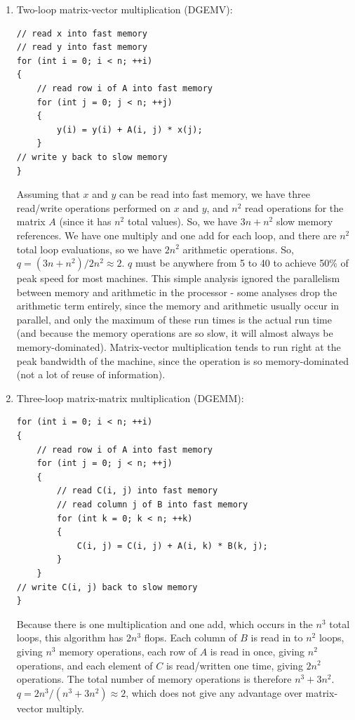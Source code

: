 \documentclass[10pt]{article}
\begin{document}
\begin{flushleft}
\begin{enumerate}
\item Two-loop matrix-vector multiplication (DGEMV):

\begin{lstlisting}[basicstyle=\ttfamily\small]
// read x into fast memory
// read y into fast memory
for (int i = 0; i < n; ++i)
{
	// read row i of A into fast memory
	for (int j = 0; j < n; ++j)
	{
		y(i) = y(i) + A(i, j) * x(j);
	}
// write y back to slow memory
}
\end{lstlisting}

Assuming that \(x\) and \(y\) can be read into fast memory, we have three read/write operations performed on \(x\) and \(y\), and \(n^2\) read operations for the matrix \(A\) (since it has \(n^2\) total values). So, we have \(3n+n^2\) slow memory references. We have one multiply and one add for each loop, and there are \(n^2\) total loop evaluations, so we have \(2n^2\) arithmetic operations. So, \(q=(3n+n^2)/2n^2\approx2\). \(q\) must be anywhere from 5 to 40 to achieve 50\% of peak speed for most machines. This simple analysis ignored the parallelism between memory and arithmetic in the processor - some analyses drop the arithmetic term entirely, since the memory and arithmetic usually occur in parallel, and only the maximum of these run times is the actual run time (and because the memory operations are so slow, it will almost always be memory-dominated). Matrix-vector multiplication tends to run right at the peak bandwidth of the machine, since the operation is so memory-dominated (not a lot of reuse of information).

\item Three-loop matrix-matrix multiplication (DGEMM): 

\begin{lstlisting}[basicstyle=\ttfamily\small]
for (int i = 0; i < n; ++i)
{
	// read row i of A into fast memory
	for (int j = 0; j < n; ++j)
	{	
		// read C(i, j) into fast memory
		// read column j of B into fast memory
		for (int k = 0; k < n; ++k)
		{
			C(i, j) = C(i, j) + A(i, k) * B(k, j);
		}
	}
// write C(i, j) back to slow memory
}
\end{lstlisting}

Because there is one multiplication and one add, which occurs in the \(n^3\) total loops, this algorithm has \(2n^3\) flops. Each column of \(B\) is read in to \(n^2\) loops, giving \(n^3\) memory operations, each row of \(A\) is read in once, giving \(n^2\) operations, and each element of \(C\) is read/written one time, giving \(2n^2\) operations. The total number of memory operations is therefore \(n^3+3n^2\). \(q=2n^3/(n^3+3n^2)\approx 2\), which does not give any advantage over matrix-vector multiply.


\end{enumerate}
\end{flushleft}
\end{document}
